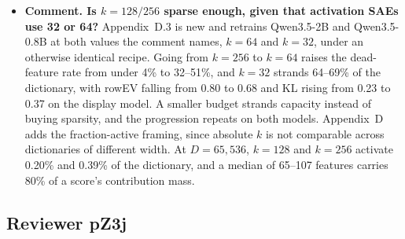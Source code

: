 \documentclass[11pt]{article}
\begin{document}
\begin{itemize}
\item \textbf{Comment. Is $k=128/256$ sparse enough, given that activation
SAEs use 32 or 64?} Appendix~D.3 is new and retrains Qwen3.5-2B and
Qwen3.5-0.8B at both values the comment names, $k=64$ and $k=32$, under an
otherwise identical recipe. Going from $k=256$ to $k=64$ raises the
dead-feature rate from under 4\% to 32--51\%, and $k=32$ strands 64--69\% of
the dictionary, with rowEV falling from 0.80 to 0.68 and KL rising from 0.23
to 0.37 on the display model. A smaller budget strands capacity instead of
buying sparsity, and the progression repeats on both models. Appendix~D adds the
fraction-active framing, since absolute $k$ is not comparable across
dictionaries of different width. At $D=65{,}536$, $k=128$ and $k=256$
activate 0.20\% and 0.39\% of the dictionary, and a median of 65--107
features carries 80\% of a score's contribution mass.
\end{itemize}

\subsection*{Reviewer pZ3j}
\end{document}
